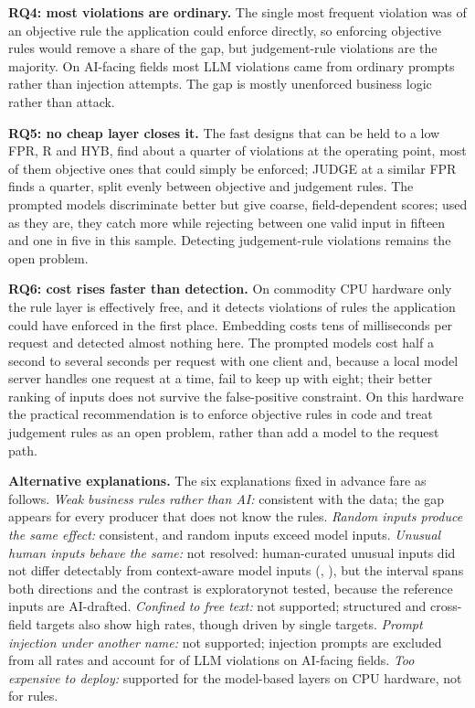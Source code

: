 \documentclass[conference]{IEEEtran}
\begin{document}
\textbf{RQ4: most violations are ordinary.} The single most frequent violation was of an objective rule
the application could enforce directly, so enforcing objective rules would remove a share of the gap,
but judgement-rule violations are the majority. On AI-facing fields most LLM violations came from
ordinary prompts rather than injection attempts. The gap is mostly unenforced business logic rather
than attack.

\textbf{RQ5: no cheap layer closes it.} The fast designs that can be held to a low FPR, R and HYB, find
about a quarter of violations at the operating point, most of them objective ones that could simply be
enforced;
JUDGE at a similar FPR finds a quarter, split evenly between objective and judgement rules. The prompted
models discriminate better but give coarse, field-dependent scores; used as they are, they catch more
while rejecting between one valid input in fifteen and one in five in this sample. Detecting
judgement-rule violations remains the open problem.

\textbf{RQ6: cost rises faster than detection.} On commodity CPU hardware only the rule layer is
effectively free, and it detects violations of rules the application could have enforced in the first
place. Embedding costs tens of milliseconds per request and detected almost nothing here. The prompted
models cost half a second to several seconds per request with one client and, because a local model server handles one request
at a time, fail to keep up with eight; their better ranking of inputs does not survive the
false-positive constraint. On this hardware the practical recommendation is to enforce objective rules
in code and treat judgement rules as an open problem, rather than add a model to the request path.

\textbf{Alternative explanations.} The six explanations fixed in advance fare as follows.
\emph{Weak business rules rather than AI:} consistent with the data; the gap appears for every
producer that does not know the rules. \emph{Random inputs produce the same effect:} consistent, and
random inputs exceed model inputs. \emph{Unusual human inputs behave the same:} \ifreviewed not resolved: human-curated unusual inputs
did not differ detectably from context-aware model inputs (, ), but the
interval spans both directions and the contrast is exploratory\else not tested, because the reference
inputs are AI-drafted\fi. \emph{Confined to free text:} not supported; structured and
cross-field targets also show high rates, though driven by single targets. \emph{Prompt injection
under another name:} not supported; injection prompts are excluded from all rates and account for
 of  LLM violations on AI-facing fields. \emph{Too expensive to deploy:} supported for the model-based layers on CPU hardware, not for rules.
\end{document}
